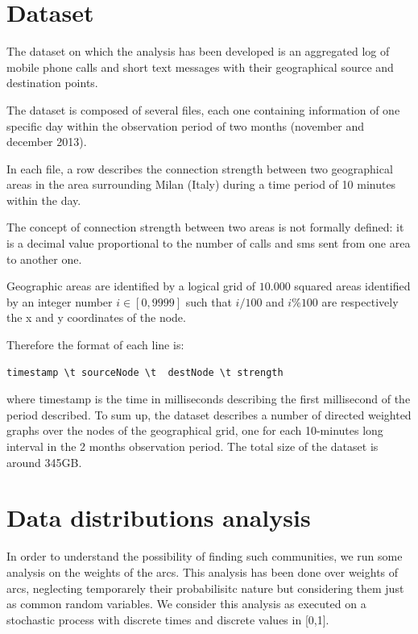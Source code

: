 \section{Dataset}
\label{thedataset}

The dataset on which the analysis has been developed is an aggregated log of mobile phone
calls and short text messages with their geographical source and destination points.

The dataset is composed of several files, each one containing information of one specific day
within the observation period of two months (november and december 2013).


In each file, a row describes the connection strength between two geographical areas in the area surrounding Milan (Italy) during a time period of 10 minutes within the day.

The concept of connection strength between two areas is not formally defined: it is a decimal value proportional to the number of calls and sms sent from one area to another one.

Geographic areas are identified by a logical grid of $10.000$ squared areas 
identified by an integer number $i \in [0, 9999]$ such that
$ i / 100 $ and $ i \% 100 $ are respectively the  
x and y coordinates of the node.

Therefore the format of each line is:

\begin{verbatim}
timestamp \t sourceNode	\t 	destNode \t strength
\end{verbatim}

where timestamp is the time in milliseconds describing the first millisecond of the period described.
To sum up, the dataset describes a number of directed weighted graphs over
the nodes of the geographical grid, one for each 10-minutes long interval
in the 2 months observation period. The total size of the dataset is around 345GB.
\newpage

\section{Data distributions analysis}
\label{ds_analysis}

In order to understand the possibility of finding such communities, 
we run some analysis on the weights of the arcs.
This analysis has been done over weights of arcs, 
neglecting temporarely their probabilisitc nature but considering
them just as common random variables.
We consider this analysis as executed on a stochastic process with discrete times and discrete values in [0,1].

